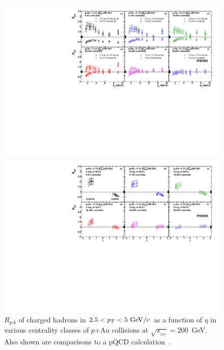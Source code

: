 \documentclass[twocolumn,letterpaper,aps,prc,longbibliography,superscriptaddress,nofootinbib,floatfix]{revtex4-2}
\newcommand{\pt}{\mbox{$p_T$}\xspace}
\newcommand{\rpa}{\mbox{$R_{pA}$}\xspace}
\newcommand{\sqsntwo}{\mbox{$\sqrt{s_{_{NN}}}=200$~GeV}\xspace}
\newcommand{\pau}{\mbox{$p$$+$Au}\xspace}
\begin{document}
\begin{figure}[tbh]
\includegraphics[width=0.998\linewidth]{pAu_centbin_RpA_vs_pT.pdf}
\caption{\label{fig:rpa_pT_cent_pau}
\rpa of charged hadrons as a function of \pt
at backward rapidity, $-2.2<\eta<-1.2$, Au-going (filled [black] circles) and
forward rapdity, $1.4<\eta<2.4$, $p$-going (open [red] circles)
in various centrality classes of \pau collisions at \sqsntwo.} 
\vspace*{\floatsep}
\includegraphics[width=0.998\linewidth]{pAu_centbin_RpA_vs_eta.pdf}
\caption{\label{fig:rpa_eta_cent_pau}
\rpa of charged hadrons in $2.5<p_T<5~{\rm GeV}/c$ as a function of 
$\eta$ in various centrality classes of \pau collisions at \sqsntwo. 
Also shown are comparisons to a pQCD calculation~\cite{Kang:2014hha}.}
\end{figure}
\end{document}
